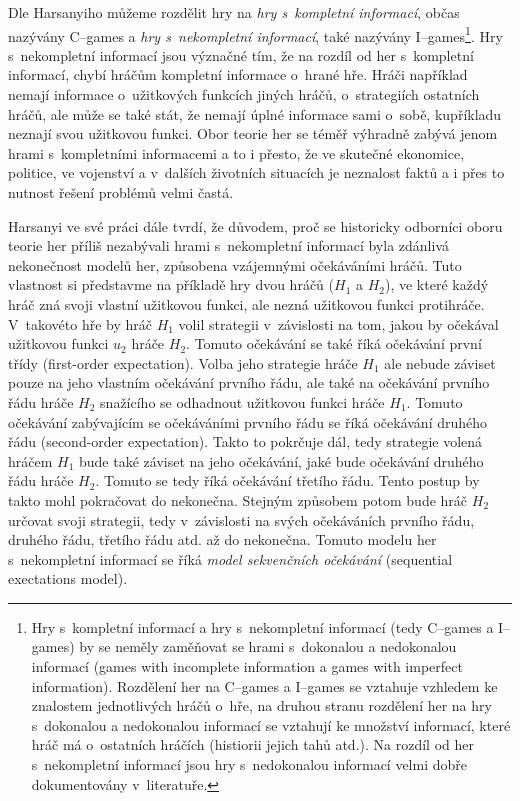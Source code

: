 \documentclass[12pt,a4paper,titlepage,final]{article}
\begin{document}
Dle Harsanyiho můžeme rozdělit hry na \textit{hry s~kompletní informací}, občas nazývány C--games a \textit{hry s~nekompletní informací}, také nazývány I--games\footnote{Hry s~kompletní informací a hry s~nekompletní informací (tedy C--games a I--games) by se neměly zaměňovat se hrami s~dokonalou a nedokonalou informací (games with incomplete information a games with imperfect information). Rozdělení her na C--games a I--games se vztahuje vzhledem ke znalostem jednotlivých hráčů o~hře, na druhou stranu rozdělení her na hry s~dokonalou a nedokonalou informací se vztahují ke množství informací, které hráč má o~ostatních hráčích (histiorii jejich tahů atd.). Na rozdíl od her s~nekompletní informací jsou hry s~nedokonalou informací velmi dobře dokumentovány v~literatuře.}.
Hry s~nekompletní informací jsou význačné tím, že na rozdíl od her s~kompletní informací, chybí hráčům kompletní informace o~hrané hře.
Hráči například nemají informace o~užitkových funkcích jiných hráčů, o~strategiích ostatních hráčů, ale může se také stát, že nemají úplné informace sami o~sobě, kupříkladu neznají svou užitkovou funkci.
Obor teorie her se téměř výhradně zabývá jenom hrami s~kompletními informacemi a to i přesto, že ve skutečné ekonomice, politice, ve vojenství a v~dalších životních situacích je neznalost faktů a i přes to nutnost řešení problémů velmi častá.

Harsanyi ve své práci dále tvrdí, že důvodem, proč se historicky odborníci oboru teorie her příliš nezabývali hrami s~nekompletní informací byla zdánlivá nekonečnost modelů her, způsobena vzájemnými očekáváními hráčů.
Tuto vlastnost si představme na příkladě hry dvou hráčů ($H_1$ a $H_2$), ve které každý hráč zná svoji vlastní užitkovou funkci, ale nezná užitkovou funkci protihráče.
V~takovéto hře by hráč $H_1$ volil strategii v~závislosti na tom, jakou by očekával užitkovou funkci $u_2$ hráče $H_2$.
Tomuto očekávání se také říká očekávání první třídy (first-order expectation).
Volba jeho strategie hráče $H_1$ ale nebude záviset pouze na jeho vlastním očekávání prvního řádu, ale také na očekávání prvního řádu hráče $H_2$ snažícího se odhadnout užitkovou funkci hráče $H_1$.
Tomuto očekávání zabývajícím se očekáváními prvního řádu se říká očekávání druhého řádu (second-order expectation).
Takto to pokrčuje dál, tedy strategie volená hráčem $H_1$ bude také záviset na jeho očekávání, jaké bude očekávání druhého řádu hráče $H_2$.
Tomuto se tedy říká očekávání třetího řádu.
Tento postup by takto mohl pokračovat do nekonečna.
Stejným způsobem potom bude hráč $H_2$ určovat svoji strategii, tedy v~závislosti na svých očekáváních prvního řádu, druhého řádu, třetího řádu atd. až do nekonečna.
Tomuto modelu her s~nekompletní informací se říká \textit{model sekvenčních očekávání} (sequential exectations model).
\end{document}

